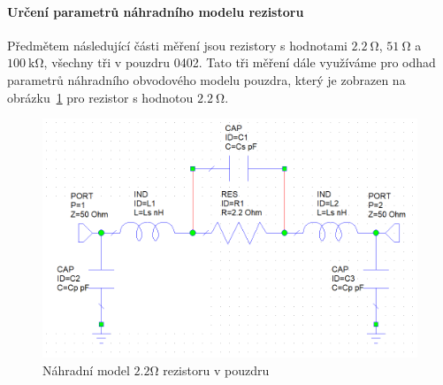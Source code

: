 \documentclass[11pt,a4paper]{article}
\newcommand{\Ohm}{\mathrm{\Omega}}
\newcommand{\kOhm}{\mathrm{k\Omega}}
\begin{document}
\paragraph*{Určení parametrů náhradního modelu rezistoru} Předmětem následující části měření jsou rezistory s hodnotami $2.2\ \Ohm$, $51\ \Ohm$ a $100\ \kOhm$, všechny tři v pouzdru 0402. Tato tři měření dále využíváme pro odhad parametrů náhradního obvodového modelu pouzdra, který je zobrazen na obrázku~\ref{fig:nahradni-model-pouzdra} pro rezistor s hodnotou $2.2\ \Ohm$.
\begin{figure}[!ht]
    \centering
    \includegraphics[width=.6\textwidth]{src/nahradni-model-pouzdra.png}
    \caption{\label{fig:nahradni-model-pouzdra}Náhradní model $2.2\Ohm$ rezistoru v pouzdru}
\end{figure}
\end{document}
